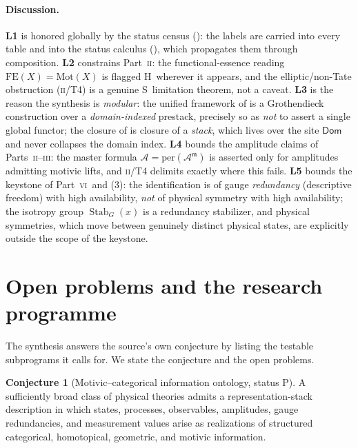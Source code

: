 \documentclass[12pt]{article}
\theoremstyle{definition}
\newtheorem{conjecture}[theorem]{Conjecture}
\theoremstyle{remark}
\newcommand{\Dom}{\mathsf{Dom}}
\newcommand{\Stab}{\operatorname{Stab}}
\newcommand{\per}{\mathrm{per}}
\newcommand{\Sstat}{\textsf{S}}
\newcommand{\Hstat}{\textsf{H}}
\newcommand{\Pstat}{\textsf{P}}
\newcommand{\Amp}{\mathcal{A}}
\newcommand{\Ampm}{\mathcal{A}^{\mathfrak{m}}}
\newcommand{\Mot}{\mathrm{Mot}}
\newcommand{\PII}{\textsc{ii}}
\newcommand{\PIII}{\textsc{iii}}
\newcommand{\PVI}{\textsc{vi}}
\begin{document}
\paragraph{Discussion.}
\textbf{L1} is honored globally by the status census (): the labels are
carried into every table and into the status calculus (), which
propagates them through composition.  \textbf{L2} constrains Part~\PII: the
functional-essence reading $\mathrm{FE}(X)=\Mot(X)$ is flagged \Hstat\ wherever it
appears, and the elliptic/non-Tate obstruction (\PII/T4) is a genuine \Sstat\ limitation
theorem, not a caveat.  \textbf{L3} is the reason the synthesis is \emph{modular}: the
unified framework of  is a Grothendieck construction over a
\emph{domain-indexed} prestack, precisely so as \emph{not} to assert a single global
functor; the closure of  is closure of a \emph{stack}, which lives
over the site $\Dom$ and never collapses the domain index.  \textbf{L4} bounds the
amplitude claims of Parts~\PII--\PIII: the master formula $\Amp=\per(\Ampm)$ is asserted
only for amplitudes admitting motivic lifts, and \PII/T4 delimits exactly where this
fails.  \textbf{L5} bounds the keystone of Part~\PVI\ and (3): the
identification is of gauge \emph{redundancy} (descriptive freedom) with high
availability, \emph{not} of physical symmetry with high availability; the isotropy group
$\Stab_G(x)$ is a redundancy stabilizer, and physical symmetries, which move between
genuinely distinct physical states, are explicitly outside the scope of the keystone.

\section{Open problems and the research programme}
\label{sec:open}

The synthesis answers the source's own conjecture by listing the testable subprograms it
calls for.  We state the conjecture and the open problems.

\begin{conjecture}[Motivic--categorical information ontology, status \Pstat]
\label{conj:onto}
A sufficiently broad class of physical theories admits a representation-stack
description in which states, processes, observables, amplitudes, gauge redundancies,
and measurement values arise as realizations of structured categorical, homotopical,
geometric, and motivic information.
\end{conjecture}
\end{document}
